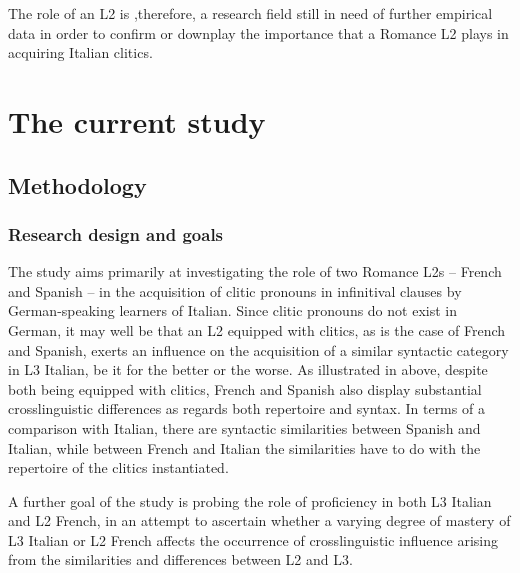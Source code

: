 \documentclass[output=paper,modfonts,nonflat,newtxmath]{langsci/langscibook}
\begin{document}
\z

\z

The role of an L2 is ,therefore, a research field still in need of further empirical data in order to confirm or downplay the importance that a Romance L2 plays in acquiring Italian clitics.

\section {The {current} study} %
\label{sec:sciutti:4}

\subsection{Methodology}%
\label{sec:sciutti:4.1}

\subsubsection{Research {design} {and} goals} %

The study aims primarily at investigating the role of two Romance L2s – French and Spanish – in the acquisition of clitic pronouns in infinitival clauses by German-speaking learners of Italian. Since clitic pronouns do not exist in German, it may well be that an L2 equipped with clitics, as is the case of French and Spanish, exerts an influence on the acquisition of a similar syntactic category in L3 Italian, be it for the better or the worse. As illustrated in  above, despite both being equipped with clitics, French and Spanish also display substantial crosslinguistic differences as regards both repertoire and syntax. In terms of a comparison with Italian, there are syntactic similarities between Spanish and Italian, while between French and Italian the similarities have to do with the repertoire of the clitics instantiated.

A further goal of the study is probing the role of proficiency in both L3 Italian and L2 French, in an attempt to ascertain whether a varying degree of mastery of L3 Italian or L2 French affects the occurrence of crosslinguistic influence arising from the similarities and differences between L2 and L3.
\end{document}

